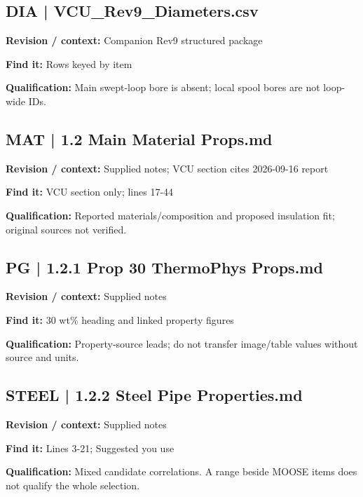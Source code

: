 \documentclass[11pt]{article}
\begin{document}
\begin{minipage}{\textwidth}\small
\subsection*{DIA | VCU\_\allowbreak{}Rev9\_\allowbreak{}Diameters.csv}
\textbf{Revision / context:} Companion Rev9 structured package\par
\textbf{Find it:} Rows keyed by item\par
\textbf{Qualification:} Main swept-loop bore is absent; local spool bores are not loop-wide IDs.\par
\end{minipage}\par\vspace{5pt}
\par
\begin{minipage}{\textwidth}\small
\subsection*{MAT | 1.2 Main Material Props.md}
\textbf{Revision / context:} Supplied notes; VCU section cites 2026-09-16 report\par
\textbf{Find it:} VCU section only; lines 17-44\par
\textbf{Qualification:} Reported materials/composition and proposed insulation fit; original sources not verified.\par
\end{minipage}\par\vspace{5pt}
\begin{minipage}{\textwidth}\small
\subsection*{PG | 1.2.1 Prop 30 ThermoPhys Props.md}
\textbf{Revision / context:} Supplied notes\par
\textbf{Find it:} 30 wt\% heading and linked property figures\par
\textbf{Qualification:} Property-source leads; do not transfer image/table values without source and units.\par
\end{minipage}\par\vspace{5pt}
\begin{minipage}{\textwidth}\small
\subsection*{STEEL | 1.2.2 Steel Pipe Properties.md}
\textbf{Revision / context:} Supplied notes\par
\textbf{Find it:} Lines 3-21; Suggested you use\par
\textbf{Qualification:} Mixed candidate correlations. A range beside MOOSE items does not qualify the whole selection.\par
\end{minipage}\par\vspace{5pt}
\end{document}
